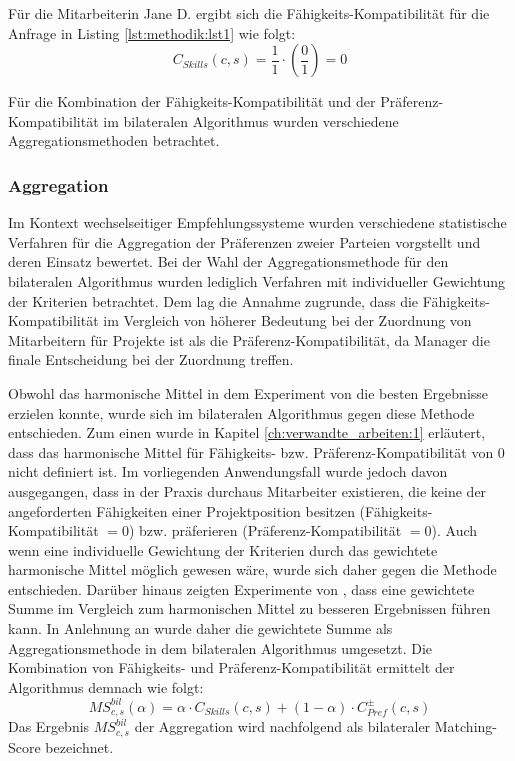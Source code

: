 Für die Mitarbeiterin Jane D. ergibt sich die Fähigkeits-Kompatibilität für die Anfrage in Listing \ref{lst:methodik:lst1} wie folgt:
\begin{equation}\label{methodik:eq:5}
    C_{Skills}(c,s) = \frac{1}{1} \cdot (\frac{0}{1}) = 0
\end{equation}

Für die Kombination der Fähigkeits-Kompatibilität und der Präferenz-Kompa\-tibilität im bilateralen Algorithmus wurden verschiedene Aggregationsmethoden betrachtet.

\subsubsection{Aggregation}
Im Kontext wechselseitiger Empfehlungssysteme wurden verschiedene statistische Verfahren für die Aggregation der Präferenzen zweier Parteien vorgstellt und deren Einsatz bewertet.
Bei der Wahl der Aggregationsmethode für den bilateralen Algorithmus wurden lediglich Verfahren mit individueller Gewichtung der Kriterien betrachtet.
Dem lag die Annahme zugrunde, dass die Fähigkeits-Kompatibilität im Vergleich von höherer Bedeutung bei der Zuordnung von Mitarbeitern für Projekte ist als die Präferenz-Kompatibilität, da Manager die finale Entscheidung bei der Zuordnung treffen.

Obwohl das harmonische Mittel in dem Experiment von \textcite[S. 1ff.]{kumari:2:inproceedings} die besten Ergebnisse erzielen konnte, wurde sich im bilateralen Algorithmus gegen diese Methode entschieden.
Zum einen wurde in Kapitel \ref{ch:verwandte_arbeiten:1} erläutert, dass das harmonische Mittel für Fähigkeits- bzw. Präferenz-Kompatibilität von 0 nicht definiert ist.
Im vorliegenden Anwendungsfall wurde jedoch davon ausgegangen, dass in der Praxis durchaus Mitarbeiter existieren, die keine der angeforderten Fähigkeiten einer Projektposition besitzen (Fähigkeits-Kompatibilität $= 0$) bzw. präferieren (Präferenz-Kompatibilität $= 0$).
Auch wenn eine individuelle Gewichtung der Kriterien durch das gewichtete harmonische Mittel möglich gewesen wäre, wurde sich daher gegen die Methode entschieden.
Darüber hinaus zeigten Experimente von \textcite[S. 131ff.]{kleinerman:2:inproceedings}, dass eine gewichtete Summe im Vergleich zum harmonischen Mittel zu besseren Ergebnissen führen kann.
In Anlehnung an \textcite[S. 131ff.]{kleinerman:2:inproceedings} wurde daher die gewichtete Summe als Aggregationsmethode in dem bilateralen Algorithmus umgesetzt.
Die Kombination von Fähigkeits- und Präferenz-Kompatibilität ermittelt der Algorithmus demnach wie folgt:
\begin{equation}\label{methodik:eq:6}
    MS_{c,s}^{bil}(\alpha) = \alpha \cdot C_{Skills}(c,s) + (1-\alpha) \cdot C_{Pref}^{\pm}(c,s)
\end{equation}
Das Ergebnis $MS_{c,s}^{bil}$ der Aggregation wird nachfolgend als bilateraler Matching-Score bezeichnet.

